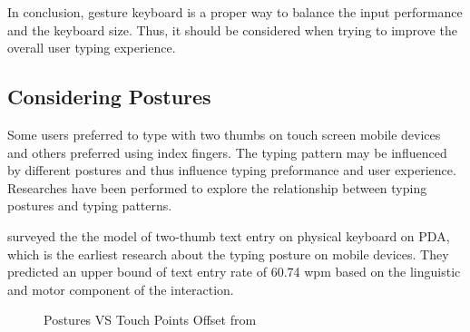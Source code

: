 \documentclass[11pt]{article}
\begin{document}
In conclusion, gesture keyboard is a proper way to balance the input performance and the keyboard size. Thus, it should be considered when trying to improve the overall user typing experience.

\subsection{Considering Postures}
Some users preferred to type with two thumbs on touch screen mobile devices and others preferred using index fingers. The typing pattern may be influenced by different postures and thus influence typing preformance and user experience. Researches have been performed to explore the relationship between typing postures and typing patterns.

\citet{twothumb2002} surveyed the the model of two-thumb text entry on physical keyboard on PDA, which is the earliest research about the typing posture on mobile devices. They predicted an upper bound of text entry rate of 60.74 wpm based on the linguistic and motor component of the interaction.

\begin{figure}[H]
\centering
{}\hfill
{}\hfill
\caption{Postures VS Touch Points Offset from \citep{10.1145/2371574.2371612}} \label{fig:posture}
\end{figure}
\end{document}
